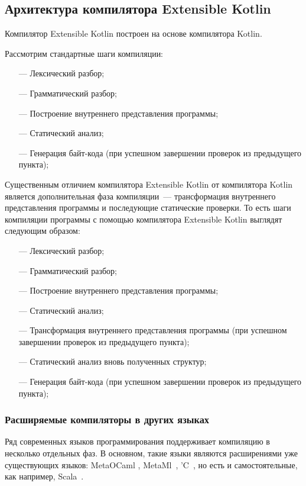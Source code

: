 \subsection{Архитектура компилятора Extensible Kotlin}\label{architecture}
Компилятор Extensible Kotlin построен на основе компилятора Kotlin.

Рассмотрим стандартные шаги компиляции:
\begin{itemize}
\item[---] Лексический разбор;
\item[---] Грамматический разбор;
\item[---] Построение внутреннего представления программы;
\item[---] Статический анализ; \td
\item[---] Генерация байт-кода (при успешном завершении проверок из предыдущего пункта);
\end{itemize}

Существенным отличием компилятора Extensible Kotlin от компилятора Kotlin является дополнительная фаза компиляции~--- трансформация внутреннего представления программы  и последующие статические проверки. То есть шаги компиляции программы с помощью компилятора Extensible Kotlin выглядят следующим образом:
\begin{itemize}
\item[---] Лексический разбор;
\item[---] Грамматический разбор;
\item[---] Построение внутреннего представления программы;
\item[---] Статический анализ; \td
\item[---] Трансформация внутреннего представления программы (при успешном завершении проверок из предыдущего пункта);
\item[---] Статический анализ вновь полученных структур; \td
\item[---] Генерация байт-кода (при успешном завершении проверок из предыдущего пункта);
\end{itemize}

\subsubsection{Расширяемые компиляторы в других языках} %
Ряд современных языков программирования поддерживает компиляцию в несколько отдельных фаз.
В основном, такие языки являются расширениями уже существующих языков: MetaOCaml \td, MetaMl~\cite{metaml}, 'C~\cite{extendible-c}, но есть и самостоятельные, как например, Scala~\cite{scala-spec}. 

